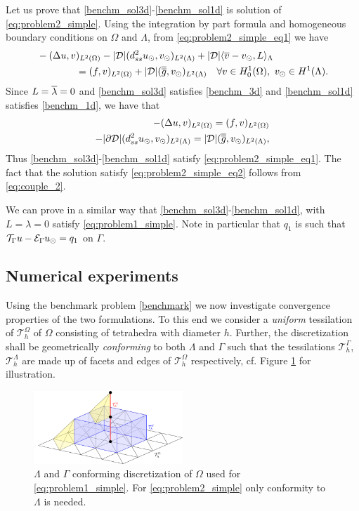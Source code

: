 Let us prove that \eqref{benchm_sol3d}-\eqref{benchm_sol1d} is solution of
\eqref{eq:problem2_simple}. Using the integration by part formula and homogeneous
boundary conditions on $\Omega$ and $\Lambda$, from \eqref{eq:problem2_simple_eq1} we have
\begin{align*}
&-(\Delta u, v)_{L^2(\Omega)} - |{\cal D}|(d^2_{ss} \ud, \vd)_{L^2(\Lambda)} 
+ |{\cal D}|\langle \avrc{v}  - \vd, L \rangle_\Lambda
\\
\nonumber
&\qquad\qquad= (f,v)_{L^2(\Omega)} + |{\cal D}| (\avrd{g},\vd)_{L^2(\Lambda)}
\quad \forall v \in H^1_0(\Omega), \ \vd \in H^1(\Lambda).
\\
\end{align*}
Since $L=\overline{\lambda}=0$ and \eqref{benchm_sol3d} satisfies \eqref{benchm_3d} and \eqref{benchm_sol1d}
satisfies \eqref{benchm_1d}, we have that
\begin{align*}
-(\Delta u, v)_{L^2(\Omega)} =  (f,v)_{L^2(\Omega)} \\
-|{\partial \cal D}|(d^2_{ss} \ud, \vd)_{L^2(\Lambda)}  = |{\cal D}| (\avrd{g},\vd)_{L^2(\Lambda)},
\end{align*}
Thus \eqref{benchm_sol3d}-\eqref{benchm_sol1d} satisfy \eqref{eq:problem2_simple_eq1}.
The fact that the solution satisfy \eqref{eq:problem2_simple_eq2} follows from \eqref{eq:couple_2}.

We can prove in a similar way that \eqref{benchm_sol3d}-\eqref{benchm_sol1d}, with $L=\lambda=0$
satisfy \eqref{eq:problem1_simple}. Note in particular that $q_1$ is such that
$\mathcal{T}_{\Gamma}u - \mathcal{E}_{\Gamma}u_{\odot} = q_1$ on $\Gamma$.

\subsection{Numerical experiments} Using the benchmark problem \eqref{benchmark}
we now investigate convergence properties of the two formulations. To this
end we consider a \emph{uniform} tessilation of $\mathcal{T}^{\Omega}_h$ of $\Omega$ consisting of
tetrahedra with diameter $h$. Further, the discretization shall be
geometrically \emph{conforming} to both $\Lambda$ and $\Gamma$ such that
the tessilations $\mathcal{T}^{\Gamma}_h$, $\mathcal{T}^{\Lambda}_h$ are made up
of facets and edges of $\mathcal{T}^{\Omega}_h$ respectively, cf. Figure \ref{fig:mesh}
for illustration.

\begin{figure}
  \begin{center}
    \includegraphics[width=0.5\textwidth]{./graphics/conform_mesh.pdf}
    \caption{$\Lambda$ and $\Gamma$ conforming discretization of $\Omega$
      used for \eqref{eq:problem1_simple}. For \eqref{eq:problem2_simple}
      only conformity to $\Lambda$ is needed.
    }
    \label{fig:mesh}
  \end{center}
\end{figure}
  
